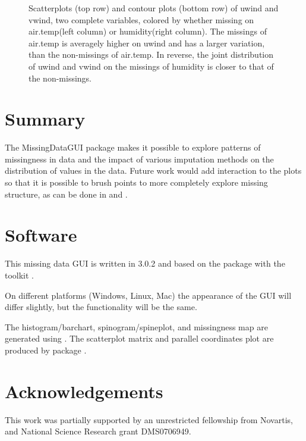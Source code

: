 \documentclass[article]{jss}
\begin{document}
\begin{center}
\begin{figure}[h]
\begin{centering}
\begin{tabular}{ccc}
\end{tabular}
\par\end{centering}
\caption{Scatterplots (top row) and contour plots (bottom row) of uwind and vwind, two complete variables, colored by whether missing on air.temp(left column) or humidity(right column). The missings of air.temp is averagely higher on uwind and has a larger variation, than the non-missings of air.temp. In reverse, the joint distribution of uwind and vwind on the missings of humidity is closer to that of the non-missings.}
\label{fig:uvwind}
\end{figure}
\par\end{center}


\section{Summary}

The MissingDataGUI  package makes it possible to explore patterns of missingness in data and the impact of various imputation methods on the distribution of values in the data. Future work would add interaction to the plots so that it is possible to brush points to more completely explore missing structure, as can be done in  and .


\section*{Software}

This missing data GUI is written in  3.0.2 \citep{r} and based on the package  \citep{gwidgets} with the toolkit . 

On different platforms (Windows, Linux, Mac) the appearance of the GUI will differ slightly, but the functionality will be the same.

The histogram/barchart, spinogram/spineplot, and missingness map are generated using  \citep{ggplot2}.
The scatterplot matrix and parallel coordinates plot are produced by package  \citep{ggally}.

\section*{Acknowledgements}

This work was partially supported by an unrestricted fellowship from Novartis, and National Science Research grant DMS0706949.


\end{document}
